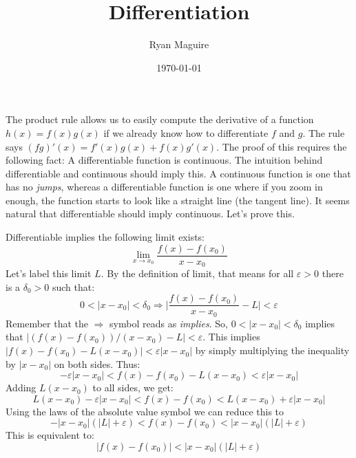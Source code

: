 \documentclass{article}
\title{Differentiation}
\author{Ryan Maguire}
\date{\today}
\theoremstyle{plain}
\begin{document}
    \maketitle
    The product rule allows us to easily compute the derivative of a function
    $h(x)=f(x)g(x)$ if we already know how to differentiate $f$ and $g$.
    The rule says $(fg)'(x)=f'(x)g(x)+f(x)g'(x)$. The proof of this requires
    the following fact: A differentiable function is continuous. The intuition
    behind differentiable and continuous should imply this. A continuous
    function is one that has no \textit{jumps}, whereas a differentiable
    function is one where if you zoom in enough, the function starts to
    look like a straight line (the tangent line). It seems natural that
    differentiable should imply continuous. Let's prove this.
    \par\hfill\par
    Differentiable implies the following limit exists:
    \begin{equation}
        \lim_{x\rightarrow{x}_{0}}\frac{f(x)-f(x_{0})}{x-x_{0}}
    \end{equation}
    Let's label this limit $L$. By the definition of limit, that means for
    all $\varepsilon>0$ there is a $\delta_{0}>0$ such that:
    \begin{equation}
        0<|x-x_{0}|<\delta_{0}\Rightarrow
        \Big|\frac{f(x)-f(x_{0})}{x-x_{0}}-L\Big|<\varepsilon
    \end{equation}
    Remember that the $\Rightarrow$ symbol reads as \textit{implies}. So,
    $0<|x-x_{0}|<\delta_{0}$ implies that
    $|(f(x)-f(x_{0}))/(x-x_{0})-L|<\varepsilon$. This implies
    $|f(x)-f(x_{0})-L(x-x_{0})|<\varepsilon|x-x_{0}|$ by simply
    multiplying the inequality by $|x-x_{0}|$ on both sides. Thus:
    \begin{equation}
        -\varepsilon|x-x_{0}|<f(x)-f(x_{0})-L(x-x_{0})<\varepsilon|x-x_{0}|
    \end{equation}
    Adding $L(x-x_{0})$ to all sides, we get:
    \begin{equation}
        L(x-x_{0})-\varepsilon|x-x_{0}|<f(x)-f(x_{0})
            <L(x-x_{0})+\varepsilon|x-x_{0}|
    \end{equation}
    Using the laws of the absolute value symbol we can reduce this to
    \begin{equation}
        -|x-x_{0}|(|L|+\varepsilon)<f(x)-f(x_{0})<|x-x_{0}|(|L|+\varepsilon)
    \end{equation}
    This is equivalent to:
    \begin{equation}
        |f(x)-f(x_{0})|<|x-x_{0}|(|L|+\varepsilon)
    \end{equation}
\end{document}
